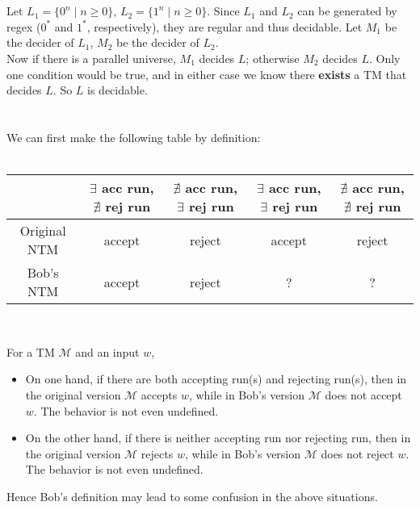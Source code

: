 \documentclass{article}
\newcommand{\mg}[1][G]{\ifmmode \mathcal{#1} \else $\mathcal{#1}$ \fi}
\begin{document}
    \section{}
        Let $L_1 = \{ 0^n \mid n \geq 0 \}$, $L_2 = \{ 1^n \mid n \geq 0 \}$. Since $L_1$ and $L_2$ can be generated by regex ($0^*$ and $1^*$, respectively), they are regular and thus decidable. Let $M_1$ be the decider of $L_1$, $M_2$ be the decider of $L_2$. \\
        Now if there is a parallel universe, $M_1$ decides $L$; otherwise $M_2$ decides $L$. Only one condition would be true, and in either case we know there \textbf{exists} a TM that decides $L$. So $L$ is decidable.
    
    \section{}
        We can first make the following table by definition: \\ \\
        \begin{tabular}{c|c|c|c|c}
             & $\exists$ acc run, $\nexists$ rej run & $\nexists$ acc run, $\exists$ rej run & $\exists$ acc run, $\exists$ rej run & $\nexists$ acc run, $\nexists$ rej run \\ \hline
            Original NTM & accept & reject & accept & reject \\ \hline
            Bob's NTM & accept & reject & ? & ?
        \end{tabular} \\ \newpage
        
        For a TM \mg[M] and an input $w$,
        \begin{itemize}
            \item On one hand, if there are both accepting run(s) and rejecting run(s), then in the original version \mg[M] accepts $w$, while in Bob's version \mg[M] does not accept $w$. The behavior is not even undefined. \\
            \item On the other hand, if there is neither accepting run nor rejecting run, then in the original version \mg[M] rejects $w$, while in Bob's version \mg[M] does not reject $w$. The behavior is not even undefined.
        \end{itemize}
        
        Hence Bob's definition may lead to some confusion in the above situations.
    
\end{document}
